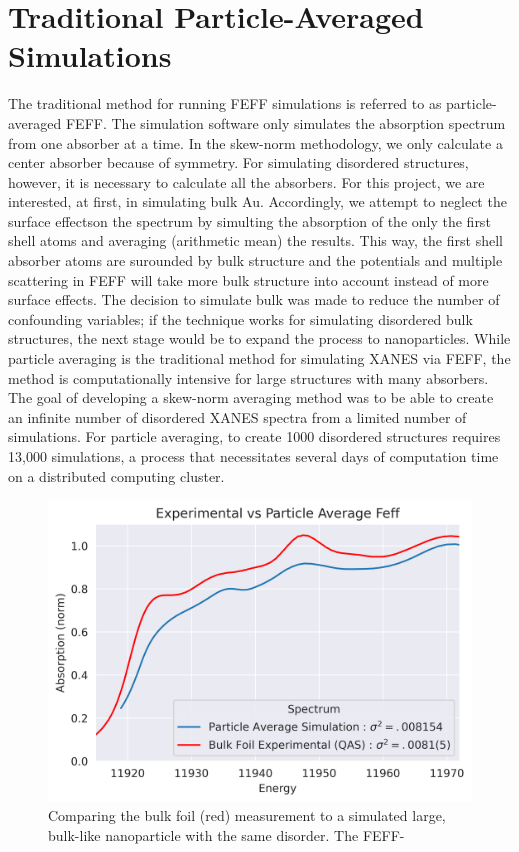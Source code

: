 \section{Traditional Particle-Averaged Simulations} 
\label{sec:traditional-disorder}
The traditional method for running FEFF simulations is referred to as particle-averaged FEFF. The simulation software only simulates the absorption spectrum from one absorber at a time. In the skew-norm methodology, we only calculate a center absorber because of symmetry. For simulating disordered structures, however, it is necessary to calculate all the absorbers. For this project, we are interested, at first, in simulating bulk Au. Accordingly, we attempt to neglect the surface effectson the spectrum by simulting the absorption of the only the first shell atoms and averaging (arithmetic mean) the results. This way, the first shell absorber atoms are surounded by bulk structure and the potentials and multiple scattering in FEFF will take more bulk structure into account instead of more surface effects. The decision to simulate bulk was made to reduce the number of confounding variables; if the technique works for simulating disordered bulk structures, the next stage would be to expand the process to nanoparticles. While particle averaging is the traditional method for simulating XANES via FEFF, the method is computationally intensive for large structures with many absorbers. The goal of developing a skew-norm averaging method was to be able to create an infinite number of disordered XANES spectra from a limited number of simulations. For particle averaging, to create 1000 disordered structures requires 13,000 simulations, a process that necessitates several days of computation time on a distributed computing cluster.

\begin{figure}[h!]
	\centering
	\includegraphics[width=.7\linewidth]{Chapters/Figures/Bulk_experimental_vs_pa_comparison.png}
	\caption[Simulation vs. Experimental 3]{Comparing the bulk foil (red) measurement to a simulated large, bulk-like nanoparticle with the same disorder. The FEFF-}
	\label{fig:avg-experimental-vs-simulation2}
\end{figure}


